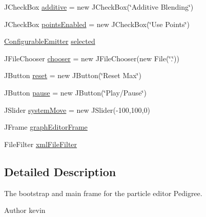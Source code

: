 \begin{DoxyCompactItemize}
\item 
J\+Check\+Box \mbox{\hyperlink{classorg_1_1newdawn_1_1slick_1_1tools_1_1peditor_1_1_particle_editor_a0d9d0e20f004cbd5e65f148b99b63093}{additive}} = new J\+Check\+Box(\char`\"{}Additive Blending\char`\"{})
\item 
J\+Check\+Box \mbox{\hyperlink{classorg_1_1newdawn_1_1slick_1_1tools_1_1peditor_1_1_particle_editor_a06e9238557a48255d04a41dc2fba3b6f}{points\+Enabled}} = new J\+Check\+Box(\char`\"{}Use Points\char`\"{})
\item 
\mbox{\hyperlink{classorg_1_1newdawn_1_1slick_1_1particles_1_1_configurable_emitter}{Configurable\+Emitter}} \mbox{\hyperlink{classorg_1_1newdawn_1_1slick_1_1tools_1_1peditor_1_1_particle_editor_ac63e919aceff5c0b0c3b9a307b5f079a}{selected}}
\item 
J\+File\+Chooser \mbox{\hyperlink{classorg_1_1newdawn_1_1slick_1_1tools_1_1peditor_1_1_particle_editor_a7a921beab5e50d8482810cf42136ee17}{chooser}} = new J\+File\+Chooser(new File(\char`\"{}.\char`\"{}))
\item 
J\+Button \mbox{\hyperlink{classorg_1_1newdawn_1_1slick_1_1tools_1_1peditor_1_1_particle_editor_a6f351e1ee7a153f93d3889c8da7fcab6}{reset}} = new J\+Button(\char`\"{}Reset Max\char`\"{})
\item 
J\+Button \mbox{\hyperlink{classorg_1_1newdawn_1_1slick_1_1tools_1_1peditor_1_1_particle_editor_a8f8a1b85a218d37ec4af235fefbfdbdb}{pause}} = new J\+Button(\char`\"{}Play/Pause\char`\"{})
\item 
J\+Slider \mbox{\hyperlink{classorg_1_1newdawn_1_1slick_1_1tools_1_1peditor_1_1_particle_editor_a59b07ee0b275f384b9dd38e6323930da}{system\+Move}} = new J\+Slider(-\/100,100,0)
\item 
J\+Frame \mbox{\hyperlink{classorg_1_1newdawn_1_1slick_1_1tools_1_1peditor_1_1_particle_editor_a9af7e0bdb25c87f134a7bd1b81585a29}{graph\+Editor\+Frame}}
\item 
File\+Filter \mbox{\hyperlink{classorg_1_1newdawn_1_1slick_1_1tools_1_1peditor_1_1_particle_editor_af35ea81b927d60eeb1ec4d20e9a299a3}{xml\+File\+Filter}}
\end{DoxyCompactItemize}


\subsection{Detailed Description}
The bootstrap and main frame for the particle editor Pedigree.

\begin{DoxyAuthor}{Author}
kevin 
\end{DoxyAuthor}


